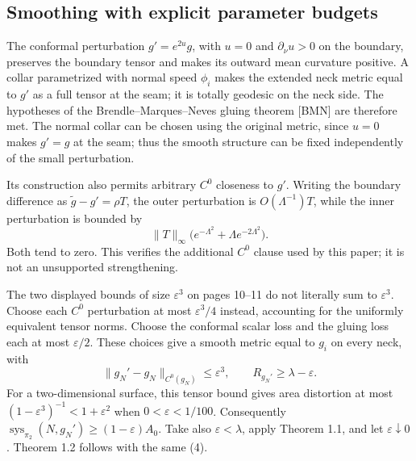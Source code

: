 \documentclass[10pt]{article}
\begin{document}
\subsection*{Smoothing with explicit parameter budgets}
The conformal perturbation \(g'=e^{2u}g\), with \(u=0\) and \(\partial_\nu u>0\) on the boundary, preserves the boundary tensor and makes its outward mean curvature positive. A collar parametrized with normal speed \(\phi_i\) makes the extended neck metric equal to \(g'\) as a full tensor at the seam; it is totally geodesic on the neck side. The hypotheses of the Brendle–Marques–Neves gluing theorem [BMN] are therefore met. The normal collar can be chosen using the original metric, since \(u=0\) makes \(g'=g\) at the seam; thus the smooth structure can be fixed independently of the small perturbation.\par
Its construction also permits arbitrary \(C^0\) closeness to \(g'\). Writing the boundary difference as \(\widetilde g-g'=\rho T\), the outer perturbation is \(O(\Lambda^{-1})T\), while the inner perturbation is bounded by \[\|T\|_\infty
 \bigl(e^{-\Lambda^2}+\Lambda e^{-2\Lambda^2}\bigr).\] Both tend to zero. This verifies the additional \(C^0\) clause used by this paper; it is not an unsupported strengthening.\par
The two displayed bounds of size \(\varepsilon^3\) on pages 10–11 do not literally sum to \(\varepsilon^3\). Choose each \(C^0\) perturbation at most \(\varepsilon^3/4\) instead, accounting for the uniformly equivalent tensor norms. Choose the conformal scalar loss and the gluing loss each at most \(\varepsilon/2\). These choices give a smooth metric equal to \(g_i\) on every neck, with \[\|g_N'-g_N\|_{C^0(g_N)}\le\varepsilon^3,\qquad
 R_{g_N'}\ge\lambda-\varepsilon.\] For a two-dimensional surface, this tensor bound gives area distortion at most \((1-\varepsilon^3)^{-1}<1+\varepsilon^2\) when \(0<\varepsilon<1/100\). Consequently \(\operatorname{sys}_{\pi_2}(N,g_N')\ge(1-\varepsilon)A_0\). Take also \(\varepsilon<\lambda\), apply Theorem 1.1, and let \(\varepsilon\downarrow0\). Theorem 1.2 follows with the same (4).\par
\end{document}
